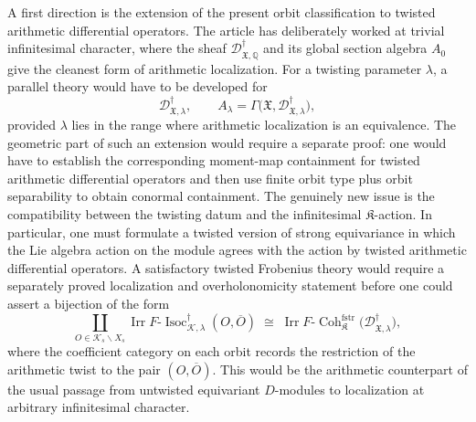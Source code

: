 \documentclass[11pt]{amsart}
\theoremstyle{plain}
\theoremstyle{definition}
\theoremstyle{remark}
\newcommand{\Coh}{\operatorname{Coh}}
\newcommand{\Isoc}{\operatorname{Isoc}}
\newcommand{\fstr}{\mathrm{fstr}}
\begin{document}
A first direction is the extension of the present orbit classification to
twisted arithmetic differential operators.  The article has deliberately worked
at trivial infinitesimal character, where the sheaf
\(\mathscr D^\dagger_{\mathfrak X,\mathbb Q}\) and its global section algebra
\(A_0\) give the cleanest form of arithmetic localization.  For a twisting
parameter \(\lambda\), a parallel theory would have to be developed for
\[
  \mathscr D^\dagger_{\mathfrak X,\lambda},
  \qquad
  A_\lambda=
  \Gamma\bigl(\mathfrak X,
  \mathscr D^\dagger_{\mathfrak X,\lambda}\bigr),
\]
provided \(\lambda\) lies in the range where arithmetic localization is an
equivalence.  The geometric part of such an extension would require a separate proof: one
would have to establish the corresponding moment-map containment for twisted
arithmetic differential operators and then use finite orbit type plus orbit separability to obtain
conormal containment.  The genuinely new issue is the compatibility
between the twisting datum and the infinitesimal \(\mathfrak K\)-action.  In
particular, one must formulate a twisted version of strong equivariance in
which the Lie algebra action on the module agrees with the action by twisted
arithmetic differential operators.  A satisfactory twisted Frobenius theory would require a separately proved
localization and overholonomicity statement before one could assert a bijection
of the form
\[
  \coprod_{O\in\mathcal K_s\backslash X_s}
  \operatorname{Irr}
  F\text{-}\Isoc^{\dagger}_{\mathcal K,\lambda}(O,\overline O)
  \;\cong\;
  \operatorname{Irr}
  F\text{-}\Coh^{\fstr}_{\mathfrak K}
  \bigl(\mathscr D^\dagger_{\mathfrak X,\lambda}\bigr),
\]
where the coefficient category on each orbit records the restriction of the
arithmetic twist to the pair \((O,\overline O)\).  This would be the arithmetic
counterpart of the usual passage from untwisted equivariant \(D\)-modules to
localization at arbitrary infinitesimal character.
\end{document}
